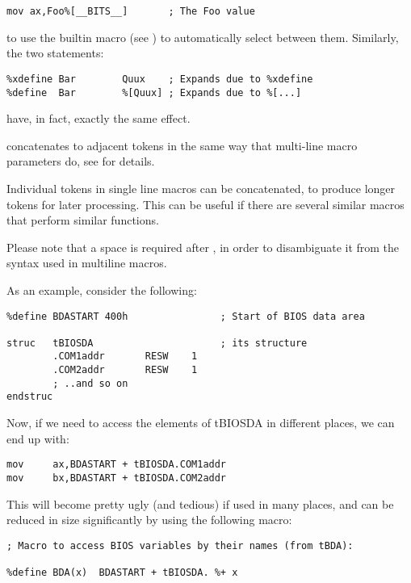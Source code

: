 \begin{lstlisting}
mov ax,Foo%[__BITS__]       ; The Foo value
\end{lstlisting}

to use the builtin macro  (see )
to automatically select between them. Similarly, the two statements:

\begin{lstlisting}
%xdefine Bar        Quux    ; Expands due to %xdefine
%define  Bar        %[Quux] ; Expands due to %[...]
\end{lstlisting}

have, in fact, exactly the same effect.

\code{\%[...]} concatenates to adjacent tokens in the same way that
multi-line macro parameters do, see  for details.


Individual tokens in single line macros can be concatenated, to produce
longer tokens for later processing. This can be useful if there are
several similar macros that perform similar functions.

Please note that a space is required after \code{\%+}, in order to
disambiguate it from the syntax  used in multiline macros.

As an example, consider the following:

\begin{lstlisting}
%define BDASTART 400h                ; Start of BIOS data area

struc   tBIOSDA                      ; its structure
        .COM1addr       RESW    1
        .COM2addr       RESW    1
        ; ..and so on
endstruc
\end{lstlisting}

Now, if we need to access the elements of tBIOSDA in different places,
we can end up with:

\begin{lstlisting}
mov     ax,BDASTART + tBIOSDA.COM1addr
mov     bx,BDASTART + tBIOSDA.COM2addr
\end{lstlisting}

This will become pretty ugly (and tedious) if used in many places, and
can be reduced in size significantly by using the following macro:

\begin{lstlisting}
; Macro to access BIOS variables by their names (from tBDA):

%define BDA(x)  BDASTART + tBIOSDA. %+ x
\end{lstlisting}

